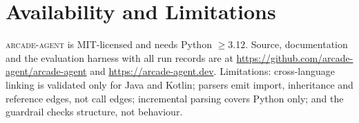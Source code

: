 \documentclass[10pt,conference]{IEEEtran}
\newcommand{\arcade}{\textsc{arcade-agent}}
\begin{document}
\section{Availability and Limitations}
\label{sec:conclusion}
\arcade{} is MIT-licensed and needs Python $\ge$3.12. Source,
documentation and the evaluation harness with all run records are at
\url{https://github.com/arcade-agent/arcade-agent} and
\url{https://arcade-agent.dev}. Limitations: cross-language linking is
validated only for Java and Kotlin; parsers emit import, inheritance and
reference edges, not call edges; incremental parsing covers Python only; and the
guardrail checks structure, not behaviour.

\balance


\end{document}
